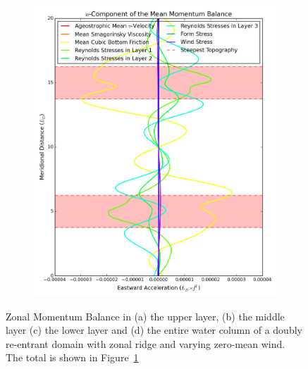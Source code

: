 \documentclass[12pt,a4paper]{report}
\newcommand*\figref[1]{Figure~\ref{#1}}
\begin{document}
\begin{figure}
\begin{subfigure}{0.48\linewidth}
 		\includegraphics[width=\linewidth ]{umom_4}
 		\label{fig:umomtotal}
 	\end{subfigure}
 	\caption{Zonal Momentum Balance in (a) the upper layer, (b) the middle layer
 		(c) the lower layer and (d) the entire water column of 
 		a doubly re-entrant domain with 
 		zonal ridge and varying zero-mean wind. The total is shown in
 		\figref{fig:umomtotal}}
 	\label{fig:umom}
 \end{figure}
 
\end{document}
